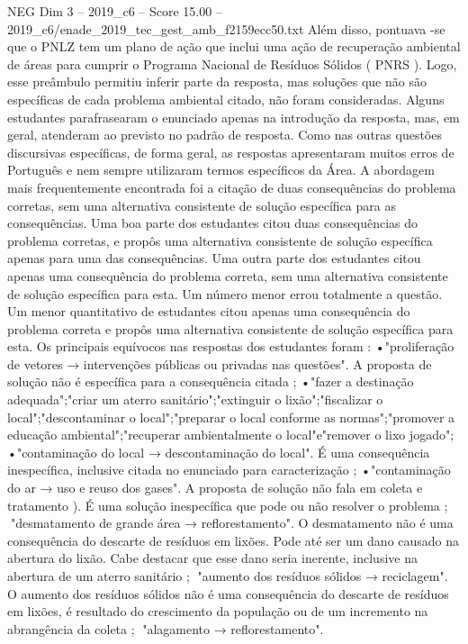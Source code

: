 \begin{textsample}{NEG Dim 3 – 2019\_c6 – Score 15.00 – 2019\_c6/enade\_2019\_tec\_gest\_amb\_f2159ecc50.txt}
Além disso, pontuava -se que o PNLZ tem um plano de ação que inclui uma ação de recuperação ambiental de áreas para cumprir o Programa Nacional de Resíduos Sólidos ( PNRS ).
Logo, esse preâmbulo permitiu inferir parte da resposta, mas soluções que não são específicas de cada problema ambiental citado, não foram consideradas.
Alguns estudantes parafrasearam o enunciado apenas na introdução da resposta, mas, em geral, atenderam ao previsto no padrão de resposta.
Como nas outras questões discursivas específicas, de forma geral, as respostas apresentaram muitos erros de Português e nem sempre utilizaram termos específicos da Área.
A abordagem mais frequentemente encontrada foi a citação de duas consequências do problema corretas, sem uma alternativa consistente de solução específica para as consequências.
Uma boa parte dos estudantes citou duas consequências do problema corretas, e propôs uma alternativa consistente de solução específica apenas para uma das consequências.
Uma outra parte dos estudantes citou apenas uma consequência do problema correta, sem uma alternativa consistente de solução específica para esta.
Um número menor errou totalmente a questão.
Um menor quantitativo de estudantes citou apenas uma consequência do problema correta e propôs uma alternativa consistente de solução específica para esta.
Os principais equívocos nas respostas dos estudantes foram : •"proliferação de vetores → intervenções públicas ou privadas nas questões".
A proposta de solução não é específica para a consequência citada ; •"fazer a destinação adequada";"criar um aterro sanitário";"extinguir o lixão";"fiscalizar o local";"descontaminar o local";"preparar o local conforme as normas";"promover a educação ambiental";"recuperar ambientalmente o local"e"remover o lixo jogado"; •"contaminação do local → descontaminação do local".
É uma consequência inespecífica, inclusive citada no enunciado para caracterização ; •"contaminação do ar → uso e reuso dos gases".
A proposta de solução não fala em coleta e tratamento ).
É uma solução inespecífica que pode ou não resolver o problema ; "desmatamento de grande área → reflorestamento".
O desmatamento não é uma consequência do descarte de resíduos em lixões.
Pode até ser um dano causado na abertura do lixão.
Cabe destacar que esse dano seria inerente, inclusive na abertura de um aterro sanitário ; "aumento dos resíduos sólidos → reciclagem".
O aumento dos resíduos sólidos não é uma consequência do descarte de resíduos em lixões, é resultado do crescimento da população ou de um incremento na abrangência da coleta ; "alagamento → reflorestamento".

\end{textsample}
